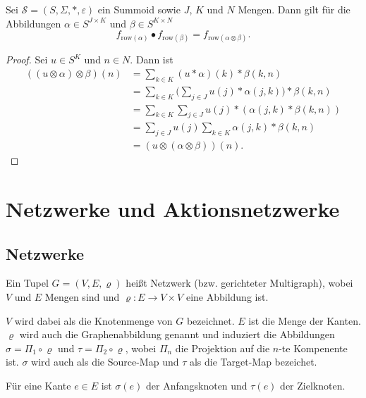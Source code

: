 \documentclass{article}
\begin{document}
\begin{theorem}
  Sei $\mathcal{S} = (S, \Sigma, \ast, \varepsilon)$ ein Summoid
  sowie $J$, $K$ und $N$ Mengen.
  Dann gilt für die Abbildungen $\alpha \in S^{J \times K}$ und $\beta \in S^{K \times N}$
  \begin{equation*}
    f_{\text{row}(\alpha)} \bullet f_{\text{row}(\beta)} = f_{\text{row}(\alpha \otimes \beta)}.
  \end{equation*}
\end{theorem}
\begin{proof}
  Sei $u \in S^K$ und $n \in N$.
  Dann ist
  \begin{align*}
    ((u \otimes \alpha) \otimes \beta)(n)
    &= \sum_{k \in K}(u \ast \alpha)(k) \ast \beta(k, n) \\
    &= \sum_{k \in K}\bigg(\sum_{j \in J} u(j) \ast \alpha(j, k)\bigg) \ast \beta(k, n) \\
    &= \sum_{k \in K}\sum_{j \in J} u(j) \ast (\alpha(j, k) \ast \beta(k, n)) \\
    &= \sum_{j \in J}u(j)\sum_{k \in K}\alpha(j, k) \ast \beta(k, n) \\
    &= (u \otimes (\alpha \otimes\beta))(n).
  \end{align*}
\end{proof}

\newpage
\section{Netzwerke und Aktionsnetzwerke}

\subsection{Netzwerke}

\begin{definition}
  Ein Tupel $G = (V, E, \varrho)$ heißt Netzwerk (bzw. gerichteter Multigraph), wobei $V$ und $E$ Mengen sind
  und $\varrho \colon E \to V \times V$ eine Abbildung ist.

  $V$ wird dabei als die Knotenmenge von $G$ bezeichnet.
  $E$ ist die Menge der Kanten.
  $\varrho$ wird auch die Graphenabbildung genannt und induziert die Abbildungen $\sigma = \Pi_1 \circ \varrho$ und $\tau = \Pi_2 \circ \varrho$,
  wobei $\Pi_n$ die Projektion auf die $n$-te Kompenente ist.
  $\sigma$ wird auch als die Source-Map und $\tau$ als die Target-Map bezeichet.

  Für eine Kante $e \in E$ ist $\sigma(e)$ der Anfangsknoten und $\tau(e)$ der Zielknoten.  
\end{definition}
\end{document}
